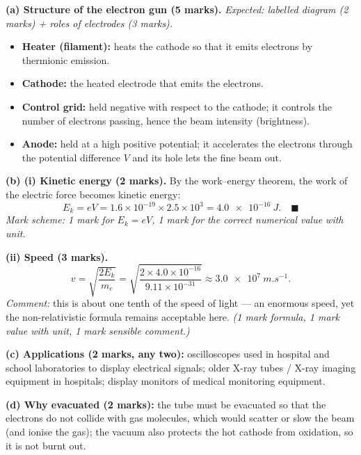 \documentclass[11pt]{article}
\newcommand{\legende}[1]{\par\vspace{6pt}{\popsemi\fontsize{9}{11.5}\selectfont\color{popmuted}#1}}
\begin{document}
\begin{corrige}
\textbf{(a) Structure of the electron gun (5 marks).} \emph{Expected: labelled diagram (2 marks) + roles of electrodes (3 marks).}
\begin{popfigure}
\begin{center}
\end{center}
\legende{Electrodes of an electron gun.}
\end{popfigure}
\begin{itemize}
\item \textbf{Heater (filament):} heats the cathode so that it emits electrons by thermionic emission.
\item \textbf{Cathode:} the heated electrode that emits the electrons.
\item \textbf{Control grid:} held negative with respect to the cathode; it controls the number of electrons passing, hence the beam intensity (brightness).
\item \textbf{Anode:} held at a high positive potential; it accelerates the electrons through the potential difference $V$ and its hole lets the fine beam out.
\end{itemize}

\textbf{(b) (i) Kinetic energy (2 marks).} By the work--energy theorem, the work of the electric force becomes kinetic energy:
\[ E_k = eV = 1.6\times 10^{-19} \times 2.5\times 10^{3} = \SI{4.0e-16}{J}. \quad\blacksquare \]
\emph{Mark scheme: 1 mark for $E_k = eV$, 1 mark for the correct numerical value with unit.}

\textbf{(ii) Speed (3 marks).}
\[ v = \sqrt{\frac{2E_k}{m_e}} = \sqrt{\frac{2 \times 4.0\times 10^{-16}}{9.11\times 10^{-31}}} \approx \SI{3.0e7}{m.s^{-1}}. \]
\emph{Comment:} this is about one tenth of the speed of light — an enormous speed, yet the non-relativistic formula remains acceptable here. \emph{(1 mark formula, 1 mark value with unit, 1 mark sensible comment.)}

\textbf{(c) Applications (2 marks, any two):} oscilloscopes used in hospital and school laboratories to display electrical signals; older X-ray tubes / X-ray imaging equipment in hospitals; display monitors of medical monitoring equipment.

\textbf{(d) Why evacuated (2 marks):} the tube must be evacuated so that the electrons do not collide with gas molecules, which would scatter or slow the beam (and ionise the gas); the vacuum also protects the hot cathode from oxidation, so it is not burnt out.
\end{corrige}
\end{document}
